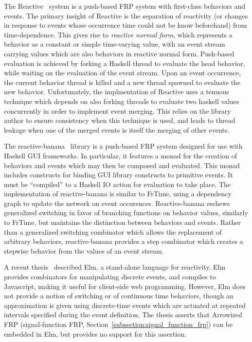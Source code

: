The Reactive~\cite{Elliott2009} system is a push-based FRP system with first-class behaviors and events. The primary insight of Reactive is
the separation of reactivity (or changes in response to events whose occurrence time could not be know beforehand) from time-dependence. This
gives rise to {\em reactive normal form}, which represents a behavior as a constant or simple time-varying value, with an event stream carrying values
which are also behaviors in reactive normal form. Push-based evaluation is achieved by forking a Haskell thread to evaluate the head behavior,
while waiting on the evaluation of the event stream. Upon an event occurrence, the current behavior thread is killed and a new thread
spawned to evaluate the new behavior. Unfortunately, the implmentation of Reactive uses a tenuous technique which depends on also forking threads to evaluate
two haskell values concurrently in order to implement event merging. This relies on the library author to ensure consistency when this technique is
used, and leads to thread leakage when one of the merged events is itself the merging of other events.

The reactive-banana~\cite{Apfelmus} library is a push-based FRP system designed for use with Haskell GUI frameworks. In particular, it features a monad for
the creation of behaviors and events which may then be composed and evaluated. This monad includes constructs for binding GUI library constructs to primitive events.
It must be ``compiled'' to a Haskell IO action for evaluation to take place. The implementation of reactive-banana is similar to FrTime, using a dependency graph to update the network on event occurences. Reactive-banana eschews generalized switching in favor of branching functions on behavior values, similarly to FrTime, but
maintains the distinction between behaviors and events. Rather than a generalized switching combinator which allows the replacement of arbitrary behaviors,
reactive-banana provides a step combinator which creates a stepwise behavior from the values of an event stream.

A recent thesis~\cite{Czaplicki2012} described Elm, a stand-alone language for reactivity. Elm provides combinators for manipulating discrete events, and
compiles to Javascript, making it useful for client-side web programming. However, Elm does not provide a notion of switching or of continuous time behaviors,
though an approximation is given using discrete-time events which are actuated at repeated intervals specified during the event definition. The thesis asserts
that Arrowized FRP (signal-function FRP, Section~\ref{subsection:signal_function_frp}) can be embedded in Elm, but provides no support for this assertion.

